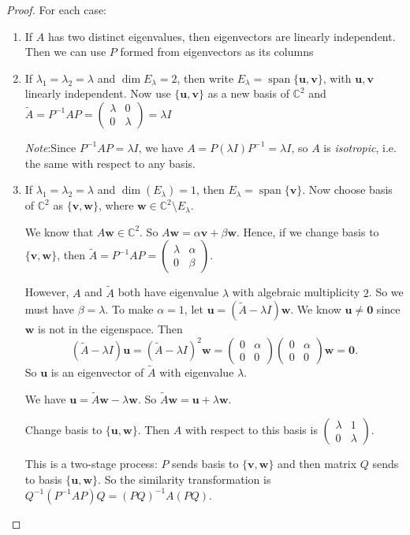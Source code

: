 \documentclass[a4paper]{article}
\theoremstyle{definition}
\newcommand{\mb}[1]{\mathbf{#1}}
\newcommand{\note}{\noindent \emph{Note}:\;}
\newcommand{\C}{\mathbb{C}}
\DeclareMathOperator\spn{span}
\begin{document}
\begin{proof}
  For each case:
  \begin{enumerate}
  \item If $A$ has two distinct eigenvalues, then eigenvectors are linearly independent. Then we can use $P$ formed from eigenvectors as its columns
  \item If $\lambda_1=\lambda_2 = \lambda$ and $\dim E_\lambda = 2$, then write $E_\lambda = \spn\{\mb{u}, \mb{v}\}$, with $\mb{u}, \mb{v}$ linearly independent. Now use $\{\mb{u}, \mb{v}\}$  as a new basis of $\C^2$ and $\tilde{A} = P^{-1}AP = 
    \begin{pmatrix}
      \lambda & 0\\
      0 & \lambda
    \end{pmatrix} = \lambda I$

    \note Since $P^{-1}AP = \lambda I$, we have $A = P(\lambda I)P^{-1} = \lambda I$, so $A$ is \emph{isotropic}, i.e. the same with respect to any basis.
  \item If $\lambda_1 = \lambda_2 = \lambda$ and $\dim (E_\lambda) = 1$, then $E_\lambda = \spn\{\mb{v}\}$. Now choose basis of $\C^2$ as $\{\mb{v}, \mb{w}\}$, where $\mb{w}\in \C^2\setminus E_\lambda$.

    We know that $A\mb{w}\in \C^2$. So $A\mb{w} = \alpha \mb{v} + \beta \mb{w}$. Hence, if we change basis to $\{\mb{v}, \mb{w}\}$, then $\tilde{A} = P^{-1}AP = 
    \begin{pmatrix}
      \lambda & \alpha\\
      0 & \beta
    \end{pmatrix}$.

    However, $A$ and $\tilde{A}$ both have eigenvalue $\lambda$ with algebraic multiplicity $2$. So we must have $\beta = \lambda$. To make $\alpha = 1$, let $\mb{u} = (\tilde{A} - \lambda I)\mb{w}$. We know $\mb{u}\not= \mb{0}$ since $\mb{w}$ is not in the eigenspace. Then 
    \[
    (\tilde{A} - \lambda I)\mb{u} = (\tilde{A} - \lambda I)^2 \mb{w} = 
    \begin{pmatrix}
      0 & \alpha\\
      0 & 0
    \end{pmatrix}
    \begin{pmatrix}
      0 & \alpha\\
      0 & 0
    \end{pmatrix}\mb{w} = \mb{0}.
    \]
    So $\mb{u}$ is an eigenvector of $\tilde{A}$ with eigenvalue $\lambda$.

    We have $\mb{u} = \tilde A\mb{w} - \lambda\mb{w}$. So $\tilde A\mb{w} = \mb{u} + \lambda\mb{w}$. 

    Change basis to $\{\mb{u}, \mb{w}\}$. Then $A$ with respect to this basis is $
    \begin{pmatrix}
      \lambda & 1\\
      0 & \lambda
    \end{pmatrix}$.

    This is a two-stage process: $P$ sends basis to $\{\mb{v}, \mb{w}\}$ and then matrix $Q$ sends to basis $\{\mb{u}, \mb{w}\}$. So the similarity transformation is $Q^{-1}(P^{-1}AP)Q = (PQ)^{-1}A(PQ)$.
  \end{enumerate}
\end{proof}
\end{document}
